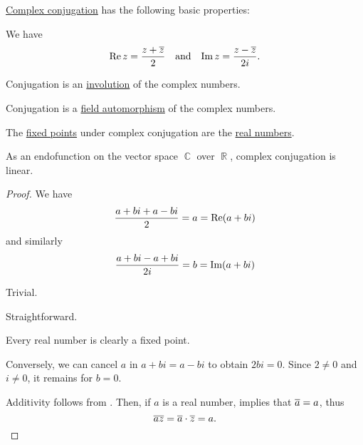 \begin{proposition}\label{thm:def:complex_conjugation}
  \hyperref[def:complex_conjugation]{Complex conjugation} has the following basic properties:
  \begin{thmenum}
     We have
    \begin{align*}
      \real z = \frac {z + \oline z} 2
      &&\T{and}&&
      \imag z = \frac {z - \oline z} {2i}.
    \end{align*}

     Conjugation is an \hyperref[def:morphism_invertibility/involution]{involution} of the complex numbers.

     Conjugation is a \hyperref[def:field/homomorphism]{field automorphism} of the complex numbers.

     The \hyperref[def:function_fixed_point]{fixed points} under complex conjugation are the \hyperref[def:real_numbers]{real numbers}.

     As an endofunction on the vector space \( \BbbC \) over \( \BbbR \), complex conjugation is linear.
  \end{thmenum}
\end{proposition}
\begin{proof}
   We have
  \begin{equation*}
    \frac {a + bi + a - bi} 2 = a = \operatorname{Re}(a + bi)
  \end{equation*}
  and similarly
  \begin{equation*}
    \frac {a + bi - a + bi} {2i} = b = \operatorname{Im}(a + bi)
  \end{equation*}

   Trivial.

   Straightforward.

   Every real number is clearly a fixed point.

  Conversely, we can cancel \( a \) in \( a + bi = a - bi \) to obtain \( 2bi = 0 \). Since \( 2 \neq 0 \) and \( i \neq 0 \), it remains for \( b = 0 \).

   Additivity follows from . Then, if \( a \) is a real number,  implies that \( \oline a = a \), thus
  \begin{equation*}
    \oline {az} = \oline a \cdot \oline z = a.
  \end{equation*}
\end{proof}

